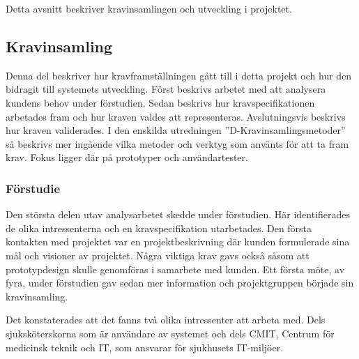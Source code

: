 \documentclass{article}
\begin{document}
Detta avsnitt beskriver kravinsamlingen och utveckling i projektet.
\subsection{Kravinsamling}


Denna del beskriver hur kravframställningen gått till i detta projekt och hur den bidragit till systemets utveckling. Först beskrivs arbetet med att analysera kundens behov under förstudien. Sedan beskrivs hur kravspecifikationen arbetades fram och hur kraven valdes att representeras. Avslutningsvis beskrivs hur kraven validerades. I den enskilda utredningen ''D-Kravinsamlingsmetoder'' så beskrivs mer ingående vilka metoder och verktyg som använts för att ta fram krav. Fokus ligger där på prototyper och användartester.
\subsubsection{Förstudie}
Den största delen utav analysarbetet skedde under förstudien. Här identifierades de olika intressenterna och en kravspecifikation utarbetades. Den första kontakten med projektet var en projektbeskrivning där kunden formulerade sina mål och visioner av projektet. Några viktiga krav gavs också såsom att prototypdesign skulle genomföras i samarbete med kunden. Ett första möte, av fyra, under förstudien gav sedan mer information och projektgruppen började sin kravinsamling. 

Det konstaterades att det fanns två olika intressenter att arbeta med. Dels sjuksköterskorna som är användare av systemet och dels CMIT, Centrum för medicinsk teknik och IT, som ansvarar för sjukhusets IT-miljöer. 
\end{document}
